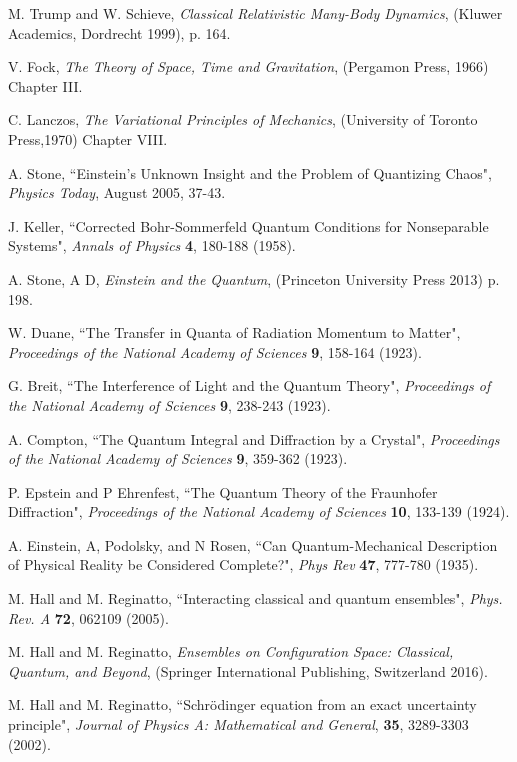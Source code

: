 \documentclass[12pt]{article}
\begin{document}
\begin{thebibliography}{99}
 M. Trump and W. Schieve, {\it Classical Relativistic Many-Body Dynamics}, (Kluwer Academics, Dordrecht 1999), p. 164.

 V. Fock, {\it The Theory of Space, Time and Gravitation}, (Pergamon Press, 1966) Chapter III.

 C. Lanczos, {\it The Variational Principles of Mechanics}, (University of Toronto Press,1970) Chapter VIII.

 A. Stone, ``Einstein's Unknown Insight and the Problem of Quantizing Chaos", {\it Physics Today}, August 2005, 37-43.

 J. Keller, ``Corrected Bohr-Sommerfeld Quantum Conditions for Nonseparable Systems", {\it Annals of Physics} \textbf{4}, 180-188 (1958).
	
 A. Stone, A D, {\it Einstein and the Quantum}, (Princeton University Press 2013) p. 198.

 W. Duane, ``The Transfer in Quanta of Radiation Momentum to Matter", {\it Proceedings of the National Academy of Sciences} \textbf{9}, 158-164 (1923).

 G. Breit, ``The Interference of Light and the Quantum Theory", {\it Proceedings of the National Academy of Sciences} \textbf{9}, 238-243 (1923).

 A. Compton, ``The Quantum Integral and Diffraction by a Crystal", {\it Proceedings of the National Academy of Sciences} \textbf{9}, 359-362 (1923).

 P. Epstein and P Ehrenfest, ``The Quantum Theory of the Fraunhofer Diffraction", {\it Proceedings of the National Academy of Sciences} \textbf{10}, 133-139 (1924).

 A. Einstein, A, Podolsky, and N Rosen, ``Can Quantum-Mechanical Description of Physical Reality be Considered Complete?", {\it Phys Rev} \textbf{47}, 777-780 (1935).

 M. Hall and M. Reginatto, ``Interacting classical and quantum ensembles", {\it Phys. Rev. A} \textbf{72}, 062109 (2005).

 M. Hall and M. Reginatto, {\it Ensembles on Configuration Space: Classical, Quantum, and Beyond}, (Springer International Publishing, Switzerland 2016).

 M. Hall and M. Reginatto, ``Schr\"{o}dinger equation from an exact uncertainty principle", {\it Journal of Physics A: Mathematical and General}, \textbf{35}, 3289-3303 (2002).


\end{thebibliography}
\end{document}
